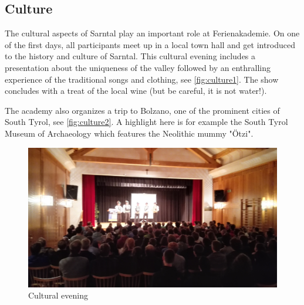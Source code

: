 \subsection{Culture}
The cultural aspects of Sarntal play an important role at Ferienakademie. On one of the first days, all participants meet up in a local town hall and get introduced to the history and culture of Sarntal. This cultural evening includes a presentation about the uniqueness of the valley followed by an enthralling experience of the traditional songs and clothing, see \autoref{fig:culture1}. The show concludes with a treat of the local wine (but be careful, it is not water!). 

The academy also organizes a trip to Bolzano, one of the prominent cities of South Tyrol, see \autoref{fig:culture2}. A highlight here is for example the South Tyrol Museum of Archaeology which features the Neolithic mummy "Ötzi".
\begin{figure}[ht]%
 	\begin{center}%
 		\includegraphics[scale=0.045]{img/Culture1.jpg}%
 		\caption{Cultural evening}\label{fig:culture1}%
 	\end{center}%
\end{figure} 
